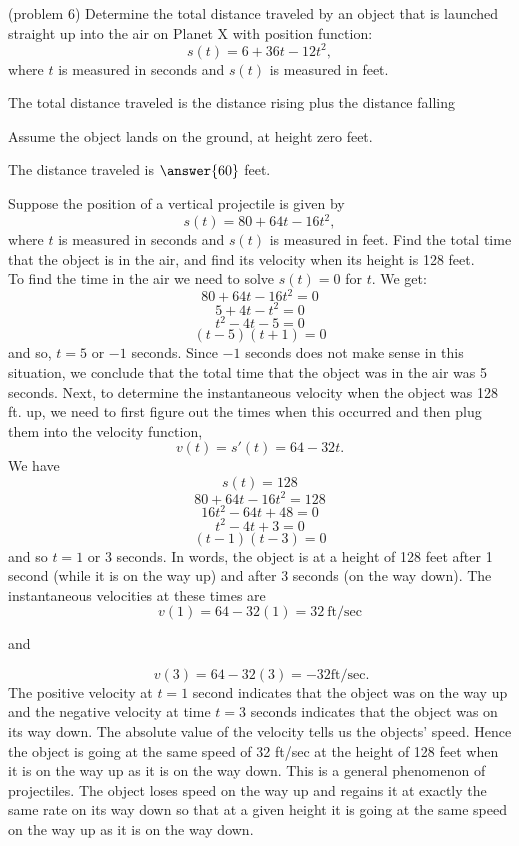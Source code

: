 \documentclass{ximera}
\begin{document}
\begin{problem}(problem 6)
Determine the total distance traveled by an object that is launched straight up into the air on Planet X with position function:
\[s(t) = 6 + 36t - 12t^2,\]
where $t$ is measured in seconds and $s(t)$ is measured in feet. 

\begin{hint}
The total distance traveled is the distance rising plus the distance falling
\end{hint}
\begin{hint}
Assume the object lands on the ground, at height zero feet.
\end{hint}

The distance traveled is $\answer{60}$ feet.

\end{problem}

\begin{example}[example 7]
Suppose the position of a vertical projectile is given by 
\[s(t) = 80 + 64t-16t^2, \]
where $t$ is measured in seconds and $s(t)$ is measured in feet. 
Find the total time that the object is in the air, and find its velocity when its height is 128 feet.\\
 
To find the time in the air we need to solve $s(t) = 0$ for $t$. We get:
\[80 + 64t-16t^2 = 0\]
\[5 + 4t-t^2 = 0\]
\[t^2 -4t -5  = 0\]
\[(t-5)(t+1)  = 0\]
and so, $t =  5$ or $-1$ seconds. Since $-1$ seconds does not make sense in this situation, we conclude that
the total time that the object was in the air was 5 seconds.
Next, to determine the instantaneous velocity when the object was 128 ft. up, 
we need to first figure out the times when this occurred and then plug them into the velocity function, 
\[v(t) = s'(t) = 64 - 32t.\]
We have
\[s(t) = 128 \]
\[80 + 64t -16t^2 = 128\]
\[  16t^2 - 64t + 48 = 0\]
\[  t^2 - 4t + 3 = 0\]
\[  (t-1)(t-3) = 0\]
and so $t= 1$ or $3$ seconds.
In words, the object is at a height of 128 feet after 1 second (while it is on the way up) and after 3 seconds (on the way down).
The instantaneous velocities at these times are
\[v(1) = 64 - 32(1) = 32 \ \text{ft/sec}\]
\begin{center}
  and
\end{center}
\[ \ v(3) = 64 - 32(3) = -32 \text{ft/sec.}\]
The positive velocity at $t= 1$ second indicates that the object was on the way up and the negative velocity 
at time $t=3$ seconds indicates 
that the object was on its way down.  The absolute value of the velocity tells us the objects' speed. 
Hence the object is going at the same speed of 32 ft/sec at the height of 128 feet when it is on the way up as it 
is on the way down.
This is a general phenomenon of projectiles. The object loses speed on the way up and 
regains it at exactly the same rate on its way down so that at a given height it is going at the same 
speed on the way up as it is on the way down.
\end{example}
\end{document}
